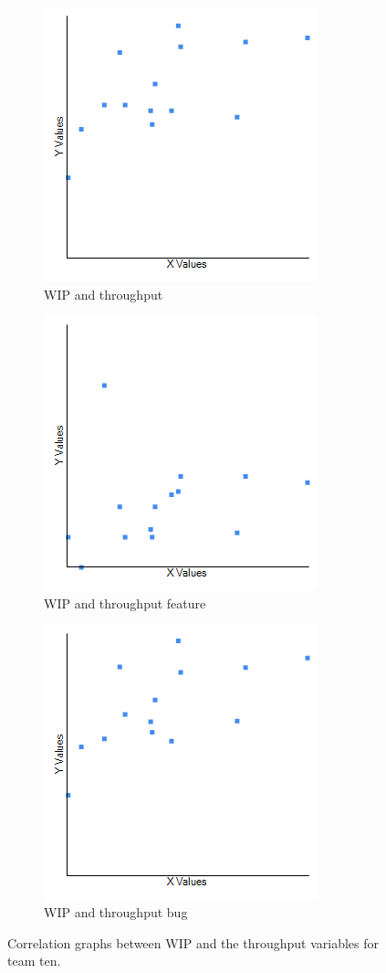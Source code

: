 \documentclass[UKenglish]{ifimaster}  %
\begin{document}
\begin{figure}[h] 
  \begin{subfigure}[b]{0.3\textwidth}
\includegraphics[scale=0.5]{Picture/Ten/WIPvsTP.png}
 \caption{WIP and throughput} 
 \label{fig:a:WIP:10}
  \end{subfigure}
  \begin{subfigure}[b]{0.3\textwidth}
\includegraphics[scale=0.5]{Picture/Ten/WIPvsTPFT.png}
 \caption{WIP and throughput feature} 
\label{fig:b:WIP:10}
  \end{subfigure}
  \begin{subfigure}[b]{0.3\textwidth}
\includegraphics[scale=0.5]{Picture/Ten/WIPvsTPB.png}
 \caption{WIP and throughput bug} 
\label{fig:c:WIP:10}
  \end{subfigure}
\caption{Correlation graphs between WIP and the throughput variables for team ten.}
\label{corr:Difference:10}
\end{figure}
\end{document}
